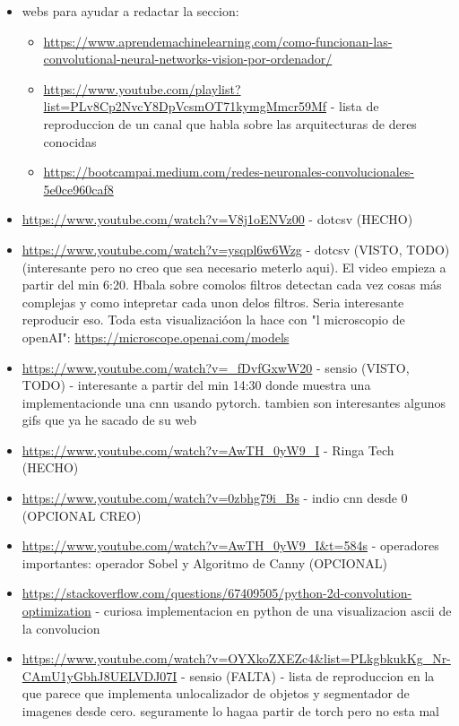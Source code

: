 \documentclass{article}
\begin{document}
\begin{itemize}
\item webs para ayudar a redactar la seccion:
\begin{itemize}
\item \url{https://www.aprendemachinelearning.com/como-funcionan-las-convolutional-neural-networks-vision-por-ordenador/}
\item \url{https://www.youtube.com/playlist?list=PLv8Cp2NvcY8DpVcsmOT71kymgMmcr59Mf} - lista de reproduccion de un canal que habla sobre las arquitecturas de deres conocidas
\item \url{https://bootcampai.medium.com/redes-neuronales-convolucionales-5e0ce960caf8}
\end{itemize}
\item \url{https://www.youtube.com/watch?v=V8j1oENVz00} - dotcsv (HECHO)
\item \url{https://www.youtube.com/watch?v=ysqpl6w6Wzg} - dotcsv (VISTO, TODO) (interesante pero no creo que sea necesario meterlo aqui). El video empieza a partir del min 6:20. Hbala sobre comolos filtros detectan cada vez cosas más complejas y como intepretar cada unon delos filtros. Seria interesante reproducir eso. Toda esta visualizacióon la hace con "l microscopio de openAI": \url{https://microscope.openai.com/models}
\item \url{https://www.youtube.com/watch?v=_fDvfGxwW20} - sensio (VISTO, TODO) - interesante a partir del min 14:30 donde muestra una implementacionde una cnn usando pytorch. tambien son interesantes algunos gifs que ya he sacado de su web
\item \url{https://www.youtube.com/watch?v=AwTH_0yW9_I} - Ringa Tech (HECHO)
\item \url{https://www.youtube.com/watch?v=0zbhg79i_Bs} - indio cnn desde 0 (OPCIONAL CREO)
\item \url{https://www.youtube.com/watch?v=AwTH_0yW9_I&t=584s} - operadores importantes: operador Sobel y Algoritmo de Canny (OPCIONAL)
\item \url{https://stackoverflow.com/questions/67409505/python-2d-convolution-optimization} - curiosa implementacion en python de una visualizacion ascii de la convolucion
\item \url{https://www.youtube.com/watch?v=OYXkoZXEZc4&list=PLkgbkukKg_Nr-CAmU1yGbhJ8UELVDJ07I} - sensio (FALTA) - lista de reproduccion en la que parece que implementa unlocalizador de objetos y segmentador de imagenes desde cero. seguramente lo hagaa partir de torch pero no esta mal
\end{itemize}
\end{document}
